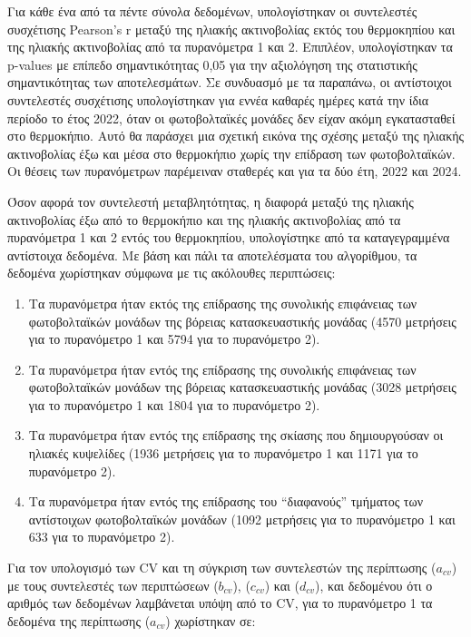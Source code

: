 \documentclass[12pt, a4paper]{report} %
\newcommand{\english}{\foreignlanguage{english}}
\begin{document}
Για κάθε ένα από τα πέντε σύνολα δεδομένων, υπολογίστηκαν οι συντελεστές συσχέτισης \english{Pearson’s r} μεταξύ της ηλιακής 
ακτινοβολίας εκτός του θερμοκηπίου και της ηλιακής ακτινοβολίας από τα πυρανόμετρα 1 και 2. Επιπλέον, υπολογίστηκαν τα 
\english{p-values} με επίπεδο σημαντικότητας 0,05 για την αξιολόγηση της στατιστικής σημαντικότητας των αποτελεσμάτων. Σε 
συνδυασμό με τα παραπάνω, οι αντίστοιχοι συντελεστές συσχέτισης υπολογίστηκαν για εννέα καθαρές ημέρες κατά την ίδια περίοδο 
το έτος 2022, όταν οι φωτοβολταϊκές μονάδες δεν είχαν ακόμη εγκατασταθεί στο θερμοκήπιο. Αυτό θα παράσχει μια σχετική εικόνα 
της σχέσης μεταξύ της ηλιακής ακτινοβολίας έξω και μέσα στο θερμοκήπιο χωρίς την επίδραση των φωτοβολταϊκών. Οι θέσεις των 
πυρανόμετρων παρέμειναν σταθερές και για τα δύο έτη, 2022 και 2024.

Όσον αφορά τον συντελεστή μεταβλητότητας, η διαφορά μεταξύ της ηλιακής ακτινοβολίας έξω από το θερμοκήπιο και της ηλιακής 
ακτινοβολίας από τα πυρανόμετρα 1 και 2 εντός του θερμοκηπίου, υπολογίστηκε από τα καταγεγραμμένα αντίστοιχα δεδομένα. 
Με βάση και πάλι τα αποτελέσματα του αλγορίθμου, τα δεδομένα χωρίστηκαν σύμφωνα με τις ακόλουθες περιπτώσεις:

\begin{enumerate}[label=(\english{\alph*$_{cv}$})]
    \item Τα πυρανόμετρα ήταν εκτός της επίδρασης της συνολικής επιφάνειας των φωτοβολταϊκών μονάδων της βόρειας κατασκευαστικής 
    μονάδας (4570 μετρήσεις για το πυρανόμετρο 1 και 5794 για το πυρανόμετρο 2).
    \item Τα πυρανόμετρα ήταν εντός της επίδρασης της συνολικής επιφάνειας των φωτοβολταϊκών μονάδων της βόρειας κατασκευαστικής 
    μονάδας (3028 μετρήσεις για το πυρανόμετρο 1 και 1804 για το πυρανόμετρο 2).
    \item Τα πυρανόμετρα ήταν εντός της επίδρασης της σκίασης που δημιουργούσαν οι ηλιακές κυψελίδες (1936 μετρήσεις για το 
    πυρανόμετρο 1 και 1171 για το πυρανόμετρο 2).
    \item Τα πυρανόμετρα ήταν εντός της επίδρασης του “διαφανούς” τμήματος των αντίστοιχων φωτοβολταϊκών μονάδων (1092 μετρήσεις 
    για το πυρανόμετρο 1 και 633 για το πυρανόμετρο 2).
\end{enumerate}

Για τον υπολογισμό των \english{CV} και τη σύγκριση των συντελεστών της περίπτωσης \english{($a_{cv}$)} με τους συντελεστές των 
περιπτώσεων \english{($b_{cv}$)}, \english{($c_{cv}$)} και \english{($d_{cv}$)}, και δεδομένου ότι ο αριθμός των δεδομένων 
λαμβάνεται υπόψη από το \english{CV}, για το πυρανόμετρο 1 τα δεδομένα της περίπτωσης \english{($a_{cv}$)} χωρίστηκαν σε:
\end{document}
